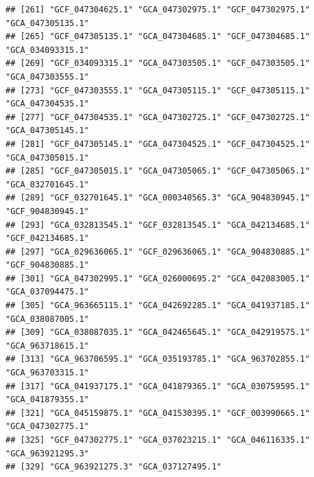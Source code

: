 \documentclass[
]{article}
\begin{document}
\begin{verbatim}
## [261] "GCF_047304625.1" "GCA_047302975.1" "GCF_047302975.1" "GCA_047305135.1"
## [265] "GCF_047305135.1" "GCA_047304685.1" "GCF_047304685.1" "GCA_034093315.1"
## [269] "GCF_034093315.1" "GCA_047303505.1" "GCF_047303505.1" "GCA_047303555.1"
## [273] "GCF_047303555.1" "GCA_047305115.1" "GCF_047305115.1" "GCA_047304535.1"
## [277] "GCF_047304535.1" "GCA_047302725.1" "GCF_047302725.1" "GCA_047305145.1"
## [281] "GCF_047305145.1" "GCA_047304525.1" "GCF_047304525.1" "GCA_047305015.1"
## [285] "GCF_047305015.1" "GCA_047305065.1" "GCF_047305065.1" "GCA_032701645.1"
## [289] "GCF_032701645.1" "GCA_000340565.3" "GCA_904830945.1" "GCF_904830945.1"
## [293] "GCA_032813545.1" "GCF_032813545.1" "GCA_042134685.1" "GCF_042134685.1"
## [297] "GCA_029636065.1" "GCF_029636065.1" "GCA_904830885.1" "GCF_904830885.1"
## [301] "GCA_047302995.1" "GCA_026000695.2" "GCA_042083005.1" "GCA_037094475.1"
## [305] "GCA_963665115.1" "GCA_042692285.1" "GCA_041937185.1" "GCA_038087005.1"
## [309] "GCA_038087035.1" "GCA_042465645.1" "GCA_042919575.1" "GCA_963718615.1"
## [313] "GCA_963706595.1" "GCA_035193785.1" "GCA_963702855.1" "GCA_963703315.1"
## [317] "GCA_041937175.1" "GCA_041879365.1" "GCA_030759595.1" "GCA_041879355.1"
## [321] "GCA_045159875.1" "GCA_041530395.1" "GCF_003990665.1" "GCA_047302775.1"
## [325] "GCF_047302775.1" "GCA_037023215.1" "GCA_046116335.1" "GCA_963921295.3"
## [329] "GCA_963921275.3" "GCA_037127495.1"
\end{verbatim}
\end{document}
